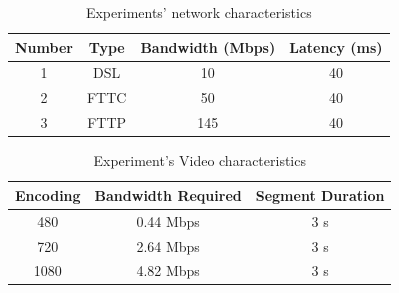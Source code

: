 \documentclass[10pt,sigconf]{acmart}
\begin{document}





\begin{table}[]
    \centering
    \begin{tabular}{c|c|c|c}
    \toprule
        Number & Type & Bandwidth (Mbps)  & Latency (ms)  \\
    \midrule
         1 & DSL  & 10  & 40 \\
    \midrule
         2 & FTTC & 50  & 40 \\
    \midrule
         3 & FTTP & 145 & 40 \\
    \bottomrule
    \end{tabular}
    \caption{Experiments' network characteristics}
    \label{tab:experiments-network}
\end{table}

\begin{table}[]
    \centering
    \begin{tabular}{c|c|c}
    \toprule
         Encoding & Bandwidth Required & Segment Duration \\
     \midrule
        480  & 0.44  Mbps & 3 s \\
        720  & 2.64  Mbps & 3 s \\
        1080 & 4.82  Mbps & 3 s \\
    \bottomrule
    \end{tabular}
    \caption{Experiment's Video characteristics}
    \label{tab:experiments-video}
\end{table}
\end{document}
